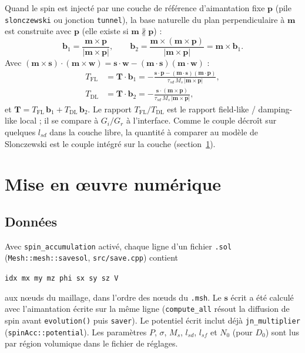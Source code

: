 \documentclass[11pt,a4paper]{article}
\newcommand{\vm}{\bm{m}}
\newcommand{\vp}{\bm{p}}
\newcommand{\vs}{\bm{s}}
\newcommand{\vT}{\bm{T}}
\newcommand{\vb}{\bm{b}}
\newcommand{\code}[1]{\texttt{#1}}
\begin{document}
Quand le spin est injecté par une couche de référence d'aimantation fixe $\vp$ (pile
\code{slonczewski} ou jonction \code{tunnel}), la base naturelle du plan perpendiculaire à $\vm$
est construite avec $\vp$ (elle existe si $\vm\nparallel\vp$) :
\begin{equation}
  \vb_1 = \frac{\vm\times\vp}{|\vm\times\vp|},\qquad
  \vb_2 = \frac{\vm\times(\vm\times\vp)}{|\vm\times\vp|} = \vm\times\vb_1 .
\end{equation}
Avec $(\vm\times\vs)\cdot(\vm\times\bm w) = \vs\cdot\bm w - (\vm\cdot\vs)(\vm\cdot\bm w)$ :
\begin{align}
  T_{\text{FL}} &= \vT\cdot\vb_1
    = -\frac{\vs\cdot\vp - (\vm\cdot\vs)(\vm\cdot\vp)}{\tau_{sd}\,M_s\,|\vm\times\vp|}, \\
  T_{\text{DL}} &= \vT\cdot\vb_2
    = -\frac{\vs\cdot(\vm\times\vp)}{\tau_{sd}\,M_s\,|\vm\times\vp|},
\end{align}
et $\vT = T_{\text{FL}}\,\vb_1 + T_{\text{DL}}\,\vb_2$. Le rapport $T_{\text{FL}}/T_{\text{DL}}$
est le rapport field-like / damping-like local ; il se compare à $G_i/G_r$ à l'interface. Comme
le couple décroît sur quelques $l_{sd}$ dans la couche libre, la quantité à comparer au modèle de
Slonczewski est le couple intégré sur la couche (section~\ref{sec:num}).

\section{Mise en œuvre numérique}
\label{sec:num}

\subsection{Données}

Avec \code{spin\_accumulation} activé, chaque ligne d'un fichier \code{.sol}
(\code{Mesh::mesh::savesol}, \code{src/save.cpp}) contient
\begin{center}
\code{idx \quad mx my mz \quad phi \quad sx sy sz \quad V}
\end{center}
aux nœuds du maillage, dans l'ordre des nœuds du \code{.msh}. Le $\vs$ écrit a été calculé avec
l'aimantation écrite sur la même ligne (\code{compute\_all} résout la diffusion de spin avant
\code{evolution()} puis \code{saver}). Le potentiel écrit inclut déjà \code{jn\_multiplier}
(\code{spinAcc::potential}). Les paramètres $P$, $\sigma$, $M_s$, $l_{sd}$, $l_{sf}$ et $N_0$ (pour
$D_0$) sont lus par région volumique dans le fichier de réglages.
\end{document}
